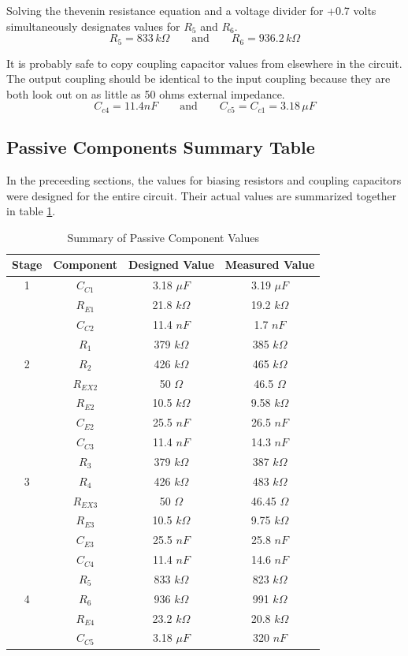 \documentclass[titlepage, letterpaper, 11pt]{article}
\begin{document}
Solving the thevenin resistance equation and a voltage divider for
+0.7 volts simultaneously designates values for $R_{5}$ and $R_{6}$.
\begin{equation*}
R_{5}=833\,k\Omega\qquad\textrm{and}\qquad R_{6}=936.2\,k\Omega
\end{equation*}

It is probably safe to copy coupling capacitor values from elsewhere
in the circuit. The output coupling should be identical to the input
coupling because they are both look out on as little as 50 ohms external
impedance.
\begin{equation*}
C_{c4}=11.4nF\qquad\textrm{and}\qquad C_{c5}=C_{c1}=3.18\,\mu F
\end{equation*}

\subsection{Passive Components Summary Table}

In the preceeding sections, the values for biasing resistors and
coupling capacitors were designed for the entire circuit. Their
actual values are summarized together in table
\ref{passiveComponents}.

\begin{table}[ht]
\centering
\caption{Summary of Passive Component Values}
\begin{tabular}{c|c|c|c}
\hline\hline
Stage	&Component	&Designed Value	&Measured Value	\\
\hline\hline
1		&$C_{C1}$	&3.18 $\mu F$	&3.19 $\mu F$	\\
		&$R_{E1}$	&21.8 $k\Omega$	&19.2 $k\Omega$	\\
\hline
		&$C_{C2}$	&11.4 $nF$		&1.7 $nF$		\\
		&$R_{1}$		&379 $k\Omega$	&385 $k\Omega$	\\
2		&$R_{2}$		&426 $k\Omega$	&465 $k\Omega$	\\
		&$R_{EX2}$	&50 $\Omega$	&46.5 $\Omega$	\\
		&$R_{E2}$	&10.5 $k\Omega$	&9.58 $k\Omega$	\\
		&$C_{E2}$	&25.5 $nF$		&26.5 $nF$		\\
\hline
		&$C_{C3}$	&11.4 $nF$		&14.3 $nF$		\\
		&$R_{3}$		&379 $k\Omega$	&387 $k\Omega$	\\
3		&$R_{4}$		&426 $k\Omega$	&483 $k\Omega$	\\
		&$R_{EX3}$	&50 $\Omega$	&46.45 $\Omega$	\\
		&$R_{E3}$	&10.5 $k\Omega$	&9.75 $k\Omega$	\\
		&$C_{E3}$	&25.5 $nF$		&25.8 $nF$		\\
\hline
		&$C_{C4}$	&11.4 $nF$		&14.6 $nF$		\\
		&$R_{5}$		&833 $k\Omega$	&823 $k\Omega$	\\
4		&$R_{6}$		&936 $k\Omega$	&991 $k\Omega$	\\
		&$R_{E4}$	&23.2 $k\Omega$	&20.8 $k\Omega$	\\
		&$C_{C5}$	&3.18 $\mu F$	&320 $nF$		\\
\hline\hline
\end{tabular}
\label{passiveComponents}
\end{table}
\end{document}
